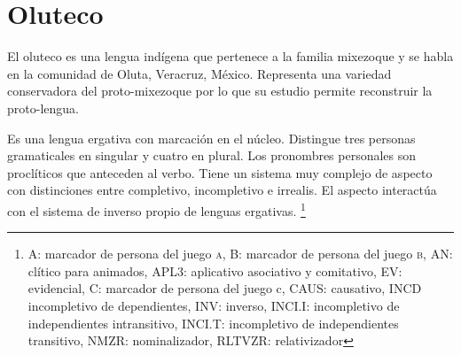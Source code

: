\section*{Oluteco}

\noindent El oluteco es una lengua indígena que pertenece a la familia mixezoque y se habla en la comunidad de Oluta, Veracruz, México. Representa una variedad conservadora del proto-mixezoque por lo que su estudio permite reconstruir la proto-lengua.

Es una lengua ergativa con marcación en el núcleo. Distingue tres personas gramaticales en singular y cuatro en plural. Los pronombres personales son proclíticos que anteceden al verbo. Tiene un sistema muy complejo de aspecto con distinciones entre completivo, incompletivo e irrealis. El aspecto interactúa con el sistema de inverso propio de lenguas ergativas.
\footnote{A: marcador de persona del juego \textsc{a}, B: marcador de persona del juego \textsc{b}, AN: clítico para animados, APL3: aplicativo asociativo y comitativo, EV: evidencial, C: marcador de persona del juego c, CAUS: causativo,  INCD incompletivo de dependientes, INV: inverso, INCI.I: incompletivo de independientes intransitivo, INCI.T: incompletivo de independientes transitivo, NMZR: nominalizador, RLTVZR: relativizador}
\vspace{0.2cm}

